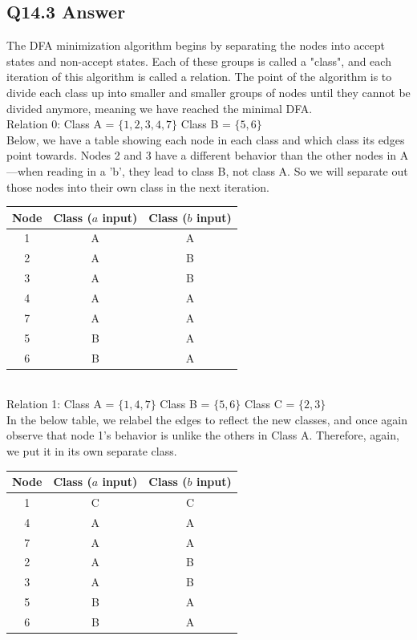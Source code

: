 \documentclass{article}
\begin{document}
\subsection*{Q14.3 Answer}
The DFA minimization algorithm begins by separating the nodes into accept states and non-accept states. Each of these groups is called a "class", and each iteration of this algorithm is called a relation. The point of the algorithm is to divide each class up into smaller and smaller groups of nodes until they cannot be divided anymore, meaning we have reached the minimal DFA.
\\ Relation 0: Class A = $\{1,2,3,4,7\}$ Class B = $\{5,6\}$
\\ Below, we have a table showing each node in each class and which class its edges point towards. Nodes 2 and 3 have a different behavior than the other nodes in A---when reading in a 'b', they lead to class B, not class A. So we will separate out those nodes into their own class in the next iteration.
\\ \begin{tabular}{c|c|c}
 Node & Class ($a$ input) & Class ($b$ input) \\
\hline
 1 & A & A \\
 2 & A & B \\
 3 & A & B \\
 4 & A & A \\
 7 & A & A \\
\hline
 5 & B & A \\
 6 & B & A \\
\end{tabular}
\\ Relation 1: Class A = $\{1,4,7\}$ Class B = $\{5,6\}$ Class C = $\{2,3\}$
\\ In the below table, we relabel the edges to reflect the new classes, and once again observe that node 1's behavior is unlike the others in Class A. Therefore, again, we put it in its own separate class.
\\ \begin{tabular}{c|c|c}
 Node & Class ($a$ input) & Class ($b$ input) \\
\hline
 1 & C & C \\
 4 & A & A \\
 7 & A & A \\
\hline
 2 & A & B \\
 3 & A & B \\
\hline
 5 & B & A \\
 6 & B & A \\
\end{tabular}
\end{document}
